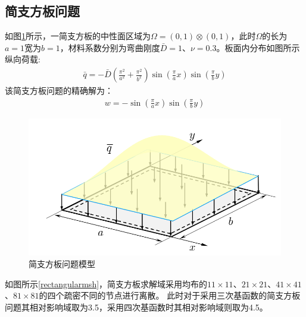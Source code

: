 \subsection{简支方板问题}
如图\ref{rectangular}所示，一简支方板的中性面区域为$\Omega=(0,1)\otimes(0,1)$，此时$\Omega$的长为$a=1$宽为$b=1$，材料系数分别为弯曲刚度$\bar{D}=1$、$\nu=0.3$。板面内分布如图所示纵向荷载:
\begin{equation}
\begin{split}
    \bar q=-\bar D(\frac{\pi^2}{a^2}+\frac{\pi^2}{b^2})\sin(\frac{\pi}{a}x)\sin(\frac{\pi}{b}y)
\end{split}
\end{equation}
该简支方板问题的精确解为：
\begin{equation}
\begin{split}
    w=-\sin(\frac{\pi}{a}x)\sin(\frac{\pi}{b}y)
\end{split}
\end{equation}
\newpage
\begin{figure}[H]
\centering
    \includegraphics[scale=0.8]{figure/PHR/R/rectangular.png}
    \caption{简支方板问题模型}\label{rectangular}
\end{figure}
如图所示\ref{rectangularmsh}，简支方板求解域采用均布的$11\times 11$、$21\times 21$、$41\times 41$、$81\times 81$的四个疏密不同的节点进行离散。
此时对于采用三次基函数的简支方板问题其相对影响域取为3.5，采用四次基函数时其相对影响域则取为4.5。\par
